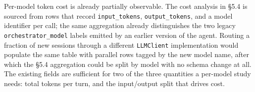 Per-model token cost is already partially observable. The cost analysis in §5.4 is sourced from rows that record \texttt{input\_tokens}, \texttt{output\_tokens}, and a model identifier per call; the same aggregation already distinguishes the two legacy \texttt{orchestrator\_model} labels emitted by an earlier version of the agent. Routing a fraction of new sessions through a different \texttt{LLMClient} implementation would populate the same table with parallel rows tagged by the new model name, after which the §5.4 aggregation could be split by model with no schema change at all. The existing fields are sufficient for two of the three quantities a per-model study needs: total tokens per turn, and the input/output split that drives cost.



